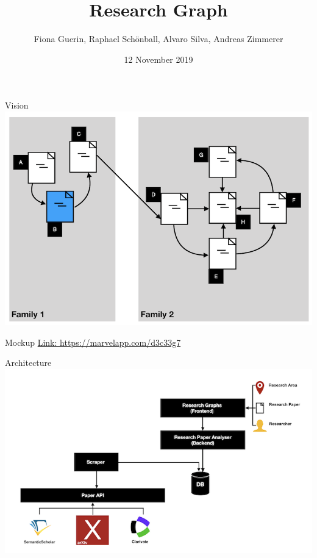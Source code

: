 \documentclass{beamer}
\title[Research Graph]{Research Graph}
\author[Guerin, Schönball, Silva, Zimmerer]{Fiona Guerin, Raphael Schönball, Alvaro Silva, Andreas Zimmerer}
\institute{Technical University of Munich}
\date{12 November 2019}
\begin{document}
\maketitle

\begin{frame}{Vision}
    \includegraphics{img_02.png}
\end{frame}

\begin{frame}{Mockup}
\url{Link: https://marvelapp.com/d3c33g7}
\end{frame}

\begin{frame}{Architecture}
    \includegraphics{img_03.png}
\end{frame}
\end{document}
